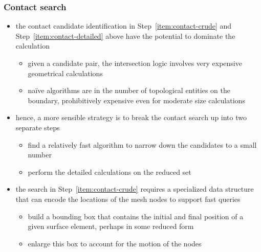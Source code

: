 \begin{frame}[fragile]
%
  \frametitle{Contact search}
%
  \begin{itemize}
%
  \item the contact candidate identification in Step~\ref{item:contact-crude} and
    Step~\ref{item:contact-detailed} above have the potential to dominate the calculation
    \begin{itemize}
    \item given a candidate pair, the intersection logic involves very expensive geometrical
      calculations
    \item na\"ive algorithms are  in the number of topological entities on the
      boundary, prohibitively expensive even for moderate size calculations
    \end{itemize}
%
  \item hence, a more sensible strategy is to break the contact search up into two separate steps
    \begin{itemize}
    \item find a relatively fast algorithm to narrow down the candidates to a small number
    \item perform the detailed calculations on the reduced set
    \end{itemize}
%
  \item the search in Step~\ref{item:contact-crude} requires a specialized data structure that
    can encode the locations of the mesh nodes to support fast queries
    \begin{itemize}
    \item build a bounding box that contains the initial and final position of a given surface
      element, perhaps in some reduced form 
    \item enlarge this box to account for the motion of the nodes
    \end{itemize}
%
  \end{itemize}
%
\end{frame}



